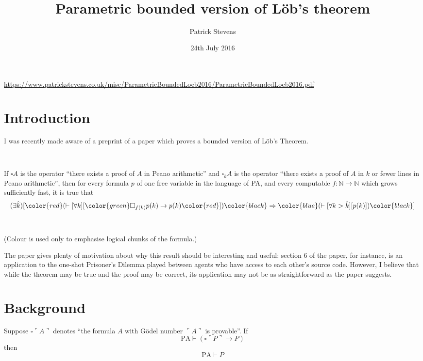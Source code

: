 \documentclass[11pt]{amsart}
\title{Parametric bounded version of L\"ob's theorem}
\author{Patrick Stevens}
\date{24th July 2016}
\newcommand{\prov}{\square}
\newcommand{\encode}[1]{\ulcorner #1 \urcorner}
\newcommand{\lob}{L\"ob's Theorem}
\begin{document}
\maketitle 
\tiny \begin{center} \url{https://www.patrickstevens.co.uk/misc/ParametricBoundedLoeb2016/ParametricBoundedLoeb2016.pdf} \end{center}
\normalsize

\section{Introduction}
I was recently made aware of a preprint\cite{critch} of a paper which proves a bounded version of \lob.

\

\begin{thm}
If $\prov A$ is the operator ``there exists a proof of $A$ in Peano arithmetic''
and $\prov_k A$ is the operator ``there exists a proof of $A$ in $k$ or fewer lines in Peano arithmetic'',
then for every formula $p$ of one free variable in the language of PA, and every computable $f: \mathbb{N} \to \mathbb{N}$
which grows sufficiently fast, it is true that 
$$(\exists \hat{k})[\color{red}(\vdash [\forall k][\color{green}\prov_{f(k)} p(k) \to p(k) \color{red}])\color{black} \Rightarrow \color{blue}(\vdash [\forall k > \hat{k}][p(k)]) \color{black}]$$
\end{thm}

\

(Colour is used only to emphasise logical chunks of the formula.)

The paper gives plenty of motivation about why this result should be interesting and useful:
section 6 of the paper, for instance, is an application to the one-shot Prisoner's Dilemma
played between agents who have access to each other's source code.
However, I believe that while the theorem may be true and the proof may be correct,
its application may not be as straightforward as the paper suggests.

\section{Background}

\begin{thm}[\lob]
Suppose $\prov \encode{A}$ denotes ``the formula $A$ with G\"odel number $\encode{A}$ is provable''.
If $$\mathrm{PA} \vdash (\prov \encode{P} \to P)$$
then
$$\mathrm{PA} \vdash P$$
\end{thm}
\end{document}
